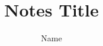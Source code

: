 \documentclass[12pt]{article}
\author{Name}
\title{Notes Title}
\begin{document}
\maketitle
\tableofcontents


\blinddocument
\end{document}
